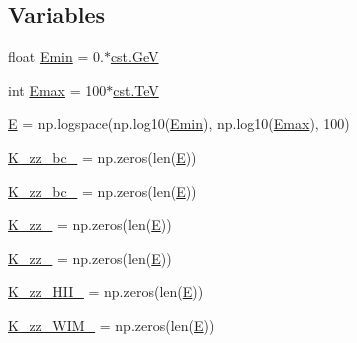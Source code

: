 \subsection*{Variables}
\begin{DoxyCompactItemize}
\item 
float \hyperlink{namespacebackground__diffusion__coefficient__3_ab51b568cd0e34bfbe59b692ecb3e3667}{Emin} = 0.$\ast$\hyperlink{constants_8h_aec0e126d9991db8ad0b26139f5860568}{cst.\+GeV}
\item 
int \hyperlink{namespacebackground__diffusion__coefficient__3_a8273e2d06df5fcd3db6a1de59b50e3a9}{Emax} = 100$\ast$\hyperlink{constants_8h_a7f801e1f6821bc6baf0652ed2496e5e9}{cst.\+TeV}
\item 
\hyperlink{namespacebackground__diffusion__coefficient__3_a1058d24f7b8074e2f1e48e5031b4ceac}{E} = np.\+logspace(np.\+log10(\hyperlink{namespacebackground__diffusion__coefficient__3_ab51b568cd0e34bfbe59b692ecb3e3667}{Emin}), np.\+log10(\hyperlink{namespacebackground__diffusion__coefficient__3_a8273e2d06df5fcd3db6a1de59b50e3a9}{Emax}), 100)
\item 
\hyperlink{namespacebackground__diffusion__coefficient__3_ae1312d0a3791d0f35be1d7f174601160}{K\+\_\+zz\+\_\+bc\+\_} = np.\+zeros(len(\hyperlink{namespacebackground__diffusion__coefficient__3_a1058d24f7b8074e2f1e48e5031b4ceac}{E}))
\item 
\hyperlink{namespacebackground__diffusion__coefficient__3_a630a25a9df27c429405fb934654ac2ea}{K\+\_\+zz\+\_\+bc\+\_} = np.\+zeros(len(\hyperlink{namespacebackground__diffusion__coefficient__3_a1058d24f7b8074e2f1e48e5031b4ceac}{E}))
\item 
\hyperlink{namespacebackground__diffusion__coefficient__3_a50badc6bd8f7a6e2d70cda6e97a4ba65}{K\+\_\+zz\+\_} = np.\+zeros(len(\hyperlink{namespacebackground__diffusion__coefficient__3_a1058d24f7b8074e2f1e48e5031b4ceac}{E}))
\item 
\hyperlink{namespacebackground__diffusion__coefficient__3_ae41dbcb564ddbed39dc8145fe8851ac8}{K\+\_\+zz\+\_} = np.\+zeros(len(\hyperlink{namespacebackground__diffusion__coefficient__3_a1058d24f7b8074e2f1e48e5031b4ceac}{E}))
\item 
\hyperlink{namespacebackground__diffusion__coefficient__3_a02bfb806fa29d868b84995fc6c47d2a0}{K\+\_\+zz\+\_\+\+H\+I\+I\+\_} = np.\+zeros(len(\hyperlink{namespacebackground__diffusion__coefficient__3_a1058d24f7b8074e2f1e48e5031b4ceac}{E}))
\item 
\hyperlink{namespacebackground__diffusion__coefficient__3_aec37e66ecf49c104aafd44a1f0380e87}{K\+\_\+zz\+\_\+\+W\+I\+M\+\_} = np.\+zeros(len(\hyperlink{namespacebackground__diffusion__coefficient__3_a1058d24f7b8074e2f1e48e5031b4ceac}{E}))

\end{DoxyCompactItemize}
